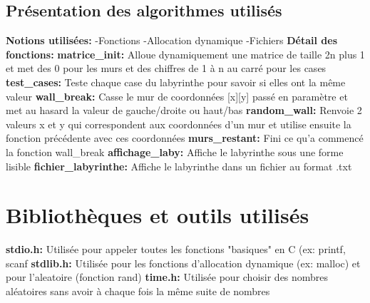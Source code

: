 \documentclass{article}
\begin{document}
\subsection{Présentation des algorithmes utilisés}
\textbf{Notions utilisées:}\newline
-Fonctions\newline
-Allocation dynamique\newline
-Fichiers\newline\newline\newline
\textbf{Détail des fonctions:}\newline\newline
\textbf{matrice\_init:} Alloue dynamiquement une matrice de taille 2n plus 1 et met des 0 pour les murs et des chiffres de 1 à n au carré pour les cases\newline \newline
\textbf{test\_cases:} Teste chaque case du labyrinthe pour savoir si elles ont la même valeur\newline\newline
\textbf{wall\_break:} Casse le mur de coordonnées [x][y] passé en paramètre et met au hasard la valeur de gauche/droite ou haut/bas\newline\newline
\textbf{random\_wall:} Renvoie 2 valeurs x et y qui correspondent aux coordonnées d’un mur et utilise ensuite la fonction précédente avec ces coordonnées\newline \newline
\textbf{murs\_restant:} Fini ce qu'a commencé la fonction wall\_break\newline \newline
\textbf{affichage\_laby:} Affiche le labyrinthe sous une forme lisible\newline \newline
\textbf{fichier\_labyrinthe:} Affiche le labyrinthe dans un fichier au format .txt


\section{Bibliothèques et outils utilisés}
\textbf{stdio.h:} Utilisée pour appeler toutes les fonctions "basiques" en C (ex: printf, scanf
\newline
\textbf{stdlib.h:} Utilisée pour les fonctions d'allocation dynamique (ex: malloc) et pour l'aleatoire (fonction rand)
\newline
\textbf{time.h:} Utilisée pour choisir des nombres aléatoires sans avoir à chaque fois la même suite de nombres
\end{document}
